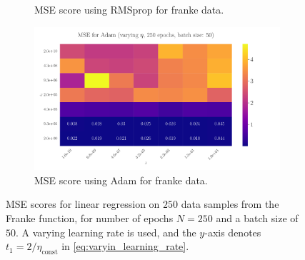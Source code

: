 \documentclass[%
reprint,s
amsmath,amssymb,
aps,
]{revtex4-2}
\begin{document}
\begin{figure}
\begin{subfigure}{0.41\textwidth}
		\caption{MSE score using RMSprop for franke data.}
		\label{fig:LinReg25x25_epoch100_bacthS50}
	\end{subfigure}
	\hfill
	\begin{subfigure}{0.41\textwidth}
		\includegraphics[width=\textwidth]{Figures/LinRegAdam_250epochs_batchS50.pdf}
		\caption{MSE score using Adam for franke data.}
		\label{fig:LinReg25x25_epoch100_bacthS50_zoomed}
	\end{subfigure}
	\caption{MSE scores for linear regression on \(250\) data samples from the Franke function, for number of epochs \(N=250\) and a batch size of \(50\). A varying learning rate is used, and the \(y\)-axis denotes \(t_1 = 2/\eta_{\text{const}}\) in \eqref{eq:varyin_learning_rate}.}
	\label{fig:LinReg_250}
\end{figure}

\end{document}
